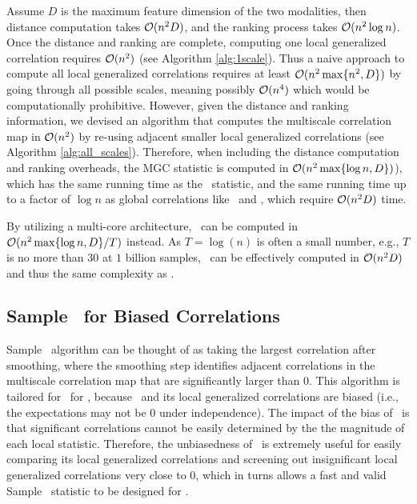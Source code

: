 \documentclass[11pt]{extarticle}
\begin{document}
Assume $D$ is the maximum feature dimension of the two modalities, then distance computation takes $\mathcal{O}(n^2 D)$, and the ranking process takes $\mathcal{O}(n^2 \log n)$. Once the distance and ranking are complete, computing one local generalized correlation requires $\mathcal{O}(n^2)$ (see Algorithm \ref{alg:1scale}). Thus a naive approach to compute all local generalized correlations requires at least $\mathcal{O}(n^2 \max\{n^2, D\})$ by going through all possible scales, meaning possibly $\mathcal{O}(n^4)$ which would be computationally prohibitive. However, given the distance and ranking information, we devised an algorithm that computes the multiscale correlation map in $\mathcal{O}(n^2)$ by re-using adjacent smaller local generalized correlations (see Algorithm \ref{alg:all_scales}).
Therefore, when including the distance computation and ranking overheads, the MGC statistic is computed in $\mathcal{O}(n^2 \max\{\log n,D\})$), which has the same running time as the \Hhg~statistic, and the same running time up to a factor of $\log n$ as  global correlations like \Dcorr~and \Mcorr, which require  $\mathcal{O}(n^2D)$ time.

By utilizing a multi-core architecture, \Mgc~can be computed in $\mathcal{O}(n^2 \max\{\log n,D\}/T)$ instead. As $T=\log(n)$ is often a small number, e.g., $T$ is no more than $30$ at $1$ billion samples, \Mgc~can be effectively computed in $\mathcal{O}(n^2 D)$ and thus the same complexity as \Dcorr.

\subsection{Sample \Mgc~for Biased Correlations}

Sample \Mgc~algorithm can be thought of as taking the largest correlation after smoothing, where the smoothing step identifies adjacent correlations in the multiscale correlation map that are significantly larger than $0$. This algorithm is tailored for \Mgc~for \Mcorr, because \Dcorr~and its local generalized correlations are biased (i.e., the expectations may not be $0$ under independence). The impact of the bias of \Dcorr~is that significant correlations cannot be easily determined by the the magnitude of each local statistic. Therefore, the unbiasedness of \Mcorr~is extremely useful for easily comparing its local generalized correlations and screening out insignificant local generalized correlations very close to $0$, which in turns allows a fast and valid Sample \Mgc~statistic to be designed for \Mcorr.
\end{document}
